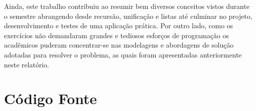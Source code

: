 \documentclass[brazil,times]{abnt}
\begin{document}
	Ainda, este trabalho contribuiu ao resumir bem diversos conceitos vistos
	durante o semestre abrangendo desde recursão, unificação e listas até culminar no
	projeto, desenvolvimento e testes de uma aplicação prática. Por outro lado,
	como os exercícios não demandaram grandes e tediosos esforços de programação os
	acadêmicos puderam concentrar-se nas modelagens e abordagens de solução
	adotadas para resolver o problema, as quais foram apresentadas anteriormente
	neste relatório.


\chapter*{Código Fonte}
	



\end{document}
